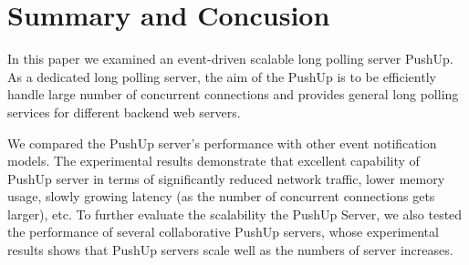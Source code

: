 \section{Summary and Concusion\\}

In this paper we examined an event-driven scalable long polling server PushUp.
As a dedicated long polling server, the aim of the PushUp is to be efficiently
handle large number of concurrent connections and provides general long 
polling services for different backend web servers.

We compared the PushUp server's performance with other event notification 
models. The experimental results demonstrate that excellent capability of 
PushUp server in terms of significantly reduced network traffic, lower memory 
usage, slowly growing latency (as the number of concurrent connections gets 
larger), etc. To further evaluate the scalability the PushUp Server, we also
tested the performance of several collaborative PushUp servers, whose 
experimental results shows that PushUp servers scale well as the numbers of
server increases.

